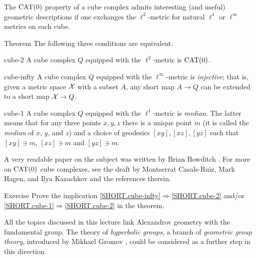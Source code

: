 The $\mathrm{CAT}(0)$ property of a cube complex admits interesting (and useful) geometric descriptions if one exchanges the $\ell^2$-metric for natural $\ell^1$ or $\ell^\infty$ metrics on each cube.

\begin{thm}{Theorem}
The following three conditions are equivalent.

\begin{subthm}{cube-2} A cube complex $Q$ equipped with the $\ell^2$-metric is $\mathrm{CAT}(0)$.
\end{subthm}

\begin{subthm}{cube-infty} A cube complex $Q$ equipped with the $\ell^\infty$-metric is \emph{injective};
that is, given a metric space $\mathcal{X}$ with a subset $A$,
any short map $A\to Q$ can be extended to a short map $\mathcal{X}\to Q$.
\end{subthm}

\begin{subthm}{cube-1} A cube complex $Q$ equipped with the $\ell^1$-metric is {}\emph{median}.
 The latter means that for any three points $x,y,z$ there is a unique point $m$ (it is called the \emph{median} of $x$, $y$, and $z$) and a choice of geodesics $[xy], [xz], [yz]$ such that $[xy]\ni m$, $[xz]\ni m$ and $[yz]\ni m$.
\end{subthm}
\end{thm}

A very readable paper on the subject was written by Brian Bowditch \cite{bowditch-2020}.
For more on $\mathrm{CAT}(0)$ cube complexes, see the draft by Montserrat Casals-Ruiz, Mark Hagen, and Ilya Kazachkov \cite{casals-hagen-kazachkov} and the references therein.

\begin{thm}{Exercise}\label{ex:cube-infty=>cube-2}
Prove the implication \ref{SHORT.cube-infty}$\Rightarrow$\ref{SHORT.cube-2} and/or
\ref{SHORT.cube-1}$\Rightarrow$\ref{SHORT.cube-2} in the theorem.
\end{thm}


All the topics discussed in this lecture link Alexandrov geometry with the fundamental group.
The theory of {}\emph{hyperbolic groups}, 
a branch of {}\emph{geometric group theory}, 
introduced by 
Mikhael Gromov \cite{gromov-1987},
could be considered as a further step in this direction.


